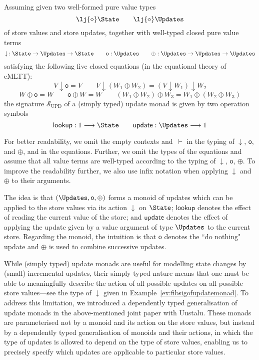 \begin{example}
\label{ex:fibsigofupdatemonad}
Assuming given two well-formed pure value types
\[
\lj {\diamond} \State
\qquad
\lj {\diamond} \Updates
\]
of store values and store updates, together with well-typed closed pure value terms
\[
\downarrow\, : \State \to \Updates \to \State
\qquad
\mathsf{o} : \Updates
\qquad
\oplus : \Updates \to \Updates \to \Updates
\]
satisfying the following five closed equations (in the equational theory of eMLTT):
\[
V \downarrow \mathsf{o} = V 
\qquad
V \downarrow (W_1 \oplus W_2) = (V \downarrow W_1) \downarrow W_2
\]
\[
W \oplus \mathsf{o} = W
\qquad
\mathsf{o} \oplus W = W
\qquad
(W_1 \oplus W_2) \oplus W_3 = W_1 \oplus (W_2 \oplus W_3)
\]
the signature $\mathcal{S}_{\text{UPD}}$ of a (simply typed) update monad is given by two operation symbols
\[
\mathsf{lookup} : 1 \longrightarrow \State
\qquad
\mathsf{update} : \Updates \longrightarrow 1
\]

For better readability, we omit the empty contexts and $\,\vdash$ in the typing of $\downarrow$, $\mathsf{o}$, and $\oplus$, and in the equations. Further, we omit the types of the equations and assume that all value terms are well-typed according to the typing of $\downarrow$, $\mathsf{o}$, $\oplus$. To improve the readability further, we also use infix notation when applying $\downarrow$ and $\oplus$ to their arguments.

The idea is that $(\Updates, \mathsf{o}, \oplus)$ forms a monoid of updates which can be applied to the store values via its action $\downarrow$ on $\State$; $\mathsf{lookup}$ denotes the effect of reading the current value of the store; and $\mathsf{update}$ denotes the effect of applying the update given by a value argument of type $\Updates$ to the current store. Regarding the monoid, the intuition is that $\mathsf{o}$ denotes the ``do nothing" update and $\oplus$ is used to combine successive updates.
\end{example}


While (simply typed) update monads are useful for modelling state changes by (small) incremental updates, their simply typed nature means that one must be able to meaningfully describe the action of all possible updates on all possible store values---see the type of $\downarrow$ given in Example~\ref{ex:fibsigofupdatemonad}. To address this limitation, we introduced a dependently typed generalisation of update monads in the above-mentioned joint paper with Uustalu. These monads are parameterised not by a monoid and its action on the store values, but instead by a dependently typed generalisation of monoids and their actions, in which the type of updates is allowed to depend on the type of store values, enabling us to precisely specify which updates are applicable to particular store values. 

